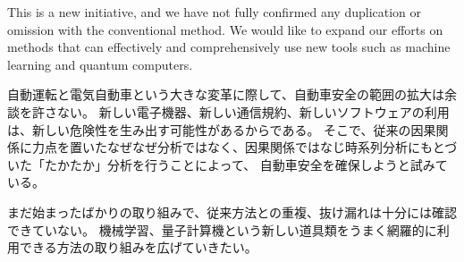 \documentclass[twocolumn]{article} %
\begin{document}
This is a new initiative, and we have not fully confirmed any duplication or omission with the conventional method.
We would like to expand our efforts on methods that can effectively and comprehensively use new tools such as machine learning and quantum computers.

自動運転と電気自動車という大きな変革に際して、自動車安全の範囲の拡大は余談を許さない。
新しい電子機器、新しい通信規約、新しいソフトウェアの利用は、新しい危険性を生み出す可能性があるからである。
そこで、従来の因果関係に力点を置いたなぜなぜ分析ではなく、因果関係ではなじ時系列分析にもとづいた「たかたか」分析を行うことによって、
自動車安全を確保しようと試みている。

まだ始まったばかりの取り組みで、従来方法との重複、抜け漏れは十分には確認できていない。
機械学習、量子計算機という新しい道具類をうまく網羅的に利用できる方法の取り組みを広げていきたい。
\end{document}
